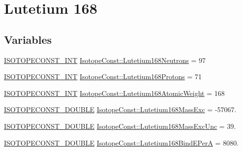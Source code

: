 \hypertarget{group___isotope_const-_lutetium-_lu168}{}\section{Lutetium 168}
\label{group___isotope_const-_lutetium-_lu168}
\subsection*{Variables}
\begin{DoxyCompactItemize}
\item 
\mbox{\hyperlink{group___isotope_const-_macros_ga5f18360b3e99483a35c32d789e62621c}{I\+S\+O\+T\+O\+P\+E\+C\+O\+N\+S\+T\+\_\+\+I\+NT}} \mbox{\hyperlink{group___isotope_const-_lutetium-_lu168_ga5f1dc51c47d268e8484e59ac8a64c52d}{Isotope\+Const\+::\+Lutetium168\+Neutrons}} = 97
\item 
\mbox{\hyperlink{group___isotope_const-_macros_ga5f18360b3e99483a35c32d789e62621c}{I\+S\+O\+T\+O\+P\+E\+C\+O\+N\+S\+T\+\_\+\+I\+NT}} \mbox{\hyperlink{group___isotope_const-_lutetium-_lu168_ga9b1b89adfacb9fbb220e4636fd9f280b}{Isotope\+Const\+::\+Lutetium168\+Protons}} = 71
\item 
\mbox{\hyperlink{group___isotope_const-_macros_ga5f18360b3e99483a35c32d789e62621c}{I\+S\+O\+T\+O\+P\+E\+C\+O\+N\+S\+T\+\_\+\+I\+NT}} \mbox{\hyperlink{group___isotope_const-_lutetium-_lu168_ga6c90b561bb846eef9aa1e5d02c3d1479}{Isotope\+Const\+::\+Lutetium168\+Atomic\+Weight}} = 168
\item 
\mbox{\hyperlink{group___isotope_const-_macros_ga8f45a7272ce02c0b4c65c44636ed719a}{I\+S\+O\+T\+O\+P\+E\+C\+O\+N\+S\+T\+\_\+\+D\+O\+U\+B\+LE}} \mbox{\hyperlink{group___isotope_const-_lutetium-_lu168_gaa906fe747af2fce5575dab88afa4908f}{Isotope\+Const\+::\+Lutetium168\+Mass\+Exc}} = -\/57067.
\item 
\mbox{\hyperlink{group___isotope_const-_macros_ga8f45a7272ce02c0b4c65c44636ed719a}{I\+S\+O\+T\+O\+P\+E\+C\+O\+N\+S\+T\+\_\+\+D\+O\+U\+B\+LE}} \mbox{\hyperlink{group___isotope_const-_lutetium-_lu168_ga7862c14196b53ae9073993ed69e7f9fa}{Isotope\+Const\+::\+Lutetium168\+Mass\+Exc\+Unc}} = 39.
\item 
\mbox{\hyperlink{group___isotope_const-_macros_ga8f45a7272ce02c0b4c65c44636ed719a}{I\+S\+O\+T\+O\+P\+E\+C\+O\+N\+S\+T\+\_\+\+D\+O\+U\+B\+LE}} \mbox{\hyperlink{group___isotope_const-_lutetium-_lu168_ga10787c48aff7e3a43ea922e8df4a0adc}{Isotope\+Const\+::\+Lutetium168\+Bind\+E\+PerA}} = 8080.
\item 

\end{DoxyCompactItemize}
